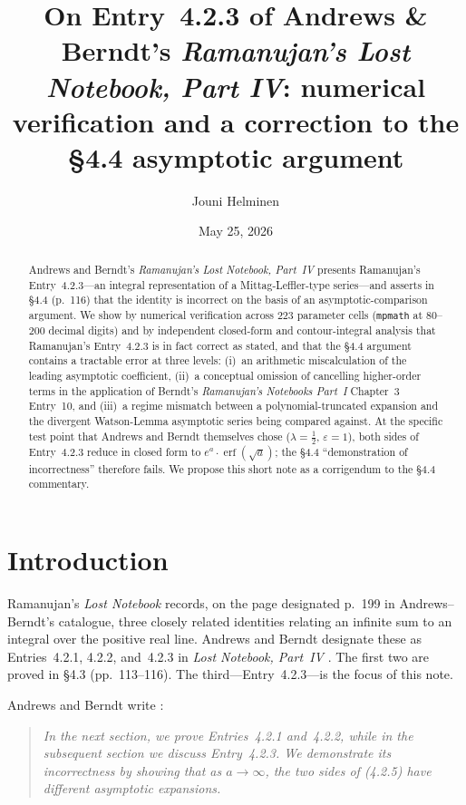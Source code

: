 \documentclass[11pt,reqno]{amsart}
\title{On Entry~4.2.3 of Andrews \& Berndt's \emph{Ramanujan's Lost Notebook,
Part IV}: numerical verification and a correction to the \S4.4 asymptotic argument}
\author{Jouni Helminen}
\date{May 25, 2026}
\theoremstyle{definition}
\DeclareMathOperator{\erf}{erf}
\begin{document}
\begin{abstract}
Andrews and Berndt's \emph{Ramanujan's Lost Notebook, Part~IV}
\cite{AB2013} presents Ramanujan's Entry~4.2.3---an integral
representation of a Mittag-Leffler-type series---and asserts in
\S4.4 (p.~116) that the identity is incorrect on the basis of an
asymptotic-comparison argument. We show by numerical verification
across $223$ parameter cells (\texttt{mpmath} at $80$--$200$
decimal digits) and by independent closed-form and contour-integral
analysis that Ramanujan's Entry~4.2.3 is in fact correct as stated,
and that the \S4.4 argument contains a tractable error at three
levels: (i)~an arithmetic miscalculation of the leading asymptotic
coefficient, (ii)~a conceptual omission of cancelling higher-order
terms in the application of Berndt's \emph{Ramanujan's Notebooks
Part~I} Chapter~3 Entry~10, and (iii)~a regime mismatch between a
polynomial-truncated expansion and the divergent Watson-Lemma
asymptotic series being compared against. At the specific test point
that Andrews and Berndt themselves chose ($\lambda=\tfrac12$,
$\varepsilon=1$), both sides of Entry~4.2.3 reduce in closed form to
$e^a \cdot \erf(\sqrt a)$; the \S4.4 ``demonstration of
incorrectness'' therefore fails. We propose this short note as a
corrigendum to the \S4.4 commentary.
\end{abstract}

\maketitle

\section{Introduction}

Ramanujan's \emph{Lost Notebook} \cite{LostNotebook} records, on the
page designated p.~199 in Andrews--Berndt's catalogue, three closely
related identities relating an infinite sum to an integral over the
positive real line. Andrews and Berndt designate these as
Entries~4.2.1, 4.2.2, and~4.2.3 in \emph{Lost Notebook, Part~IV}
\cite[Chapter~4]{AB2013}. The first two are proved in \S4.3
(pp.~113--116). The third---Entry~4.2.3---is the focus of this note.

Andrews and Berndt write \cite[p.~116, \S4.2, immediately preceding
their Entry~4.2.3]{AB2013}:
\begin{quote}
\emph{In the next section, we prove Entries~4.2.1 and~4.2.2, while in
the subsequent section we discuss Entry~4.2.3. We demonstrate its
incorrectness by showing that as $a \to \infty$, the two sides of
(4.2.5) have different asymptotic expansions.}
\end{quote}
\end{document}
